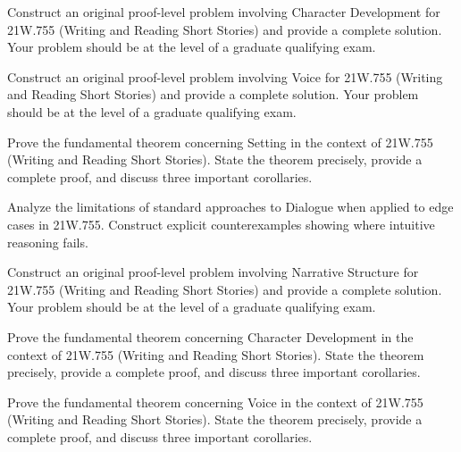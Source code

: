 \documentclass[12pt,a4paper]{exam}
\begin{document}
\begin{questions}
\vspace{0.3cm}

\question[7]
Construct an original proof-level problem involving Character Development for 21W.755 (Writing and Reading Short Stories) and provide a complete solution. Your problem should be at the level of a graduate qualifying exam.

\vspace{0.3cm}

\question[5]
Construct an original proof-level problem involving Voice for 21W.755 (Writing and Reading Short Stories) and provide a complete solution. Your problem should be at the level of a graduate qualifying exam.

\vspace{0.3cm}

\question[3]
Prove the fundamental theorem concerning Setting in the context of 21W.755 (Writing and Reading Short Stories). State the theorem precisely, provide a complete proof, and discuss three important corollaries.

\vspace{0.3cm}

\question[4]
Analyze the limitations of standard approaches to Dialogue when applied to edge cases in 21W.755. Construct explicit counterexamples showing where intuitive reasoning fails.

\vspace{0.3cm}

\question[5]
Construct an original proof-level problem involving Narrative Structure for 21W.755 (Writing and Reading Short Stories) and provide a complete solution. Your problem should be at the level of a graduate qualifying exam.

\vspace{0.3cm}

\question[5]
Prove the fundamental theorem concerning Character Development in the context of 21W.755 (Writing and Reading Short Stories). State the theorem precisely, provide a complete proof, and discuss three important corollaries.

\vspace{0.3cm}

\question[2]
Prove the fundamental theorem concerning Voice in the context of 21W.755 (Writing and Reading Short Stories). State the theorem precisely, provide a complete proof, and discuss three important corollaries.

\vspace{0.3cm}


\end{questions}
\end{document}
